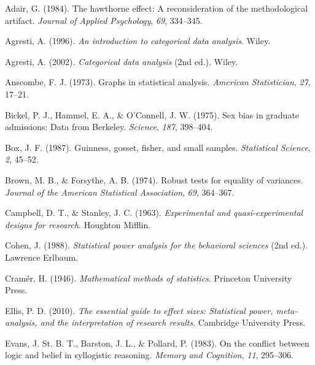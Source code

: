 \documentclass[
]{book}
\newlength{\cslhangindent}
\newlength{\cslentryspacingunit} %
\newenvironment{CSLReferences}[2] %
 {%
  \setlength{\parindent}{0pt}
  \ifodd #1
  \let\oldpar\par
  \def\par{\hangindent=\cslhangindent\oldpar}
  \fi
  \setlength{\parskip}{#2\cslentryspacingunit}
 }%
 {}
\theoremstyle{definition}
\theoremstyle{definition}
\theoremstyle{definition}
\theoremstyle{definition}
\theoremstyle{remark}
\begin{document}
\hypertarget{refs}{}
\begin{CSLReferences}{1}{0}
\leavevmode{}%
Adair, G. (1984). The hawthorne effect: A reconsideration of the methodological artifact. \emph{Journal of Applied Psychology}, \emph{69}, 334--345.

\leavevmode{}%
Agresti, A. (1996). \emph{An introduction to categorical data analysis}. Wiley.

\leavevmode{}%
Agresti, A. (2002). \emph{Categorical data analysis} (2nd ed.). Wiley.

\leavevmode{}%
Anscombe, F. J. (1973). Graphs in statistical analysis. \emph{American Statistician}, \emph{27}, 17--21.

\leavevmode{}%
Bickel, P. J., Hammel, E. A., \& O'Connell, J. W. (1975). Sex bias in graduate admissions: Data from {B}erkeley. \emph{Science}, \emph{187}, 398--404.

\leavevmode{}%
Box, J. F. (1987). Guinness, gosset, fisher, and small samples. \emph{Statistical Science}, \emph{2}, 45--52.

\leavevmode{}%
Brown, M. B., \& Forsythe, A. B. (1974). Robust tests for equality of variances. \emph{Journal of the American Statistical Association}, \emph{69}, 364--367.

\leavevmode{}%
Campbell, D. T., \& Stanley, J. C. (1963). \emph{Experimental and quasi-experimental designs for research}. Houghton Mifflin.

\leavevmode{}%
Cohen, J. (1988). \emph{Statistical power analysis for the behavioral sciences} (2nd ed.). Lawrence Erlbaum.

\leavevmode{}%
Cramér, H. (1946). \emph{Mathematical methods of statistics}. Princeton University Press.

\leavevmode{}%
Ellis, P. D. (2010). \emph{The essential guide to effect sizes: Statistical power, meta-analysis, and the interpretation of research results}. Cambridge University Press.

\leavevmode{}%
Evans, J. St. B. T., Barston, J. L., \& Pollard, P. (1983). On the conflict between logic and belief in syllogistic reasoning. \emph{Memory and Cognition}, \emph{11}, 295--306.


\end{CSLReferences}
\end{document}
